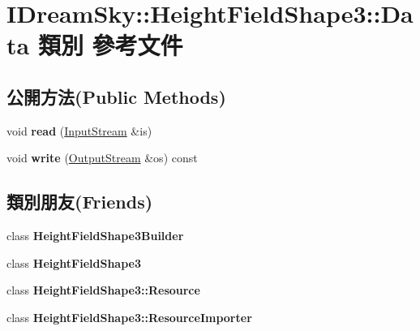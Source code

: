 \hypertarget{class_i_dream_sky_1_1_height_field_shape3_1_1_data}{}\section{I\+Dream\+Sky\+:\+:Height\+Field\+Shape3\+:\+:Data 類別 參考文件}
\label{class_i_dream_sky_1_1_height_field_shape3_1_1_data}
\subsection*{公開方法(Public Methods)}
\begin{DoxyCompactItemize}
\item 
void {\bfseries read} (\hyperlink{class_i_dream_sky_1_1_input_stream}{Input\+Stream} \&is)\hypertarget{class_i_dream_sky_1_1_height_field_shape3_1_1_data_a8b7ed5a89146bb26fcd8d4fdee3ff8ba}{}\label{class_i_dream_sky_1_1_height_field_shape3_1_1_data_a8b7ed5a89146bb26fcd8d4fdee3ff8ba}

\item 
void {\bfseries write} (\hyperlink{class_i_dream_sky_1_1_output_stream}{Output\+Stream} \&os) const \hypertarget{class_i_dream_sky_1_1_height_field_shape3_1_1_data_a9d04c01bfa08c646a52327dbf9ce9965}{}\label{class_i_dream_sky_1_1_height_field_shape3_1_1_data_a9d04c01bfa08c646a52327dbf9ce9965}

\end{DoxyCompactItemize}
\subsection*{類別朋友(Friends)}
\begin{DoxyCompactItemize}
\item 
class {\bfseries Height\+Field\+Shape3\+Builder}\hypertarget{class_i_dream_sky_1_1_height_field_shape3_1_1_data_ad601eb47f5c3430dca8c88f9dd93b2da}{}\label{class_i_dream_sky_1_1_height_field_shape3_1_1_data_ad601eb47f5c3430dca8c88f9dd93b2da}

\item 
class {\bfseries Height\+Field\+Shape3}\hypertarget{class_i_dream_sky_1_1_height_field_shape3_1_1_data_ab808f8979681967b9d908bfe30f4841b}{}\label{class_i_dream_sky_1_1_height_field_shape3_1_1_data_ab808f8979681967b9d908bfe30f4841b}

\item 
class {\bfseries Height\+Field\+Shape3\+::\+Resource}\hypertarget{class_i_dream_sky_1_1_height_field_shape3_1_1_data_a489733af8b1e9cab1ee9700c1f619014}{}\label{class_i_dream_sky_1_1_height_field_shape3_1_1_data_a489733af8b1e9cab1ee9700c1f619014}

\item 
class {\bfseries Height\+Field\+Shape3\+::\+Resource\+Importer}\hypertarget{class_i_dream_sky_1_1_height_field_shape3_1_1_data_a42ac71e9d35461ef687afa596057b1a9}{}\label{class_i_dream_sky_1_1_height_field_shape3_1_1_data_a42ac71e9d35461ef687afa596057b1a9}

\end{DoxyCompactItemize}


